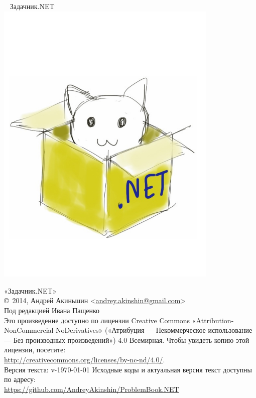 \begin{center}
~\vspace{4cm}\newline
{\Huge{Задачник.NET}}
\includegraphics[width=0.8\textwidth]{cover}
\end{center}
\newpage

\hbox{}
\vfill
{
\noindent
«Задачник.NET»\\
\copyright\ 2014, Андрей Акиньшин <\href{mailto:andrey.akinshin@gmail.com}{andrey.akinshin@gmail.com}>\\
Под редакцией Ивана Пащенко\\

\medskip
\noindent
Это произведение доступно по лицензии Creative Commons «Attribution-NonCommercial-NoDerivatives» («Атрибуция — Некоммерческое использование — Без производных произведений») 4.0 Всемирная. Чтобы увидеть копию этой лицензии, посетите:\\ \url{http://creativecommons.org/licenses/by-nc-nd/4.0/}.\\
Версия текста: v-\versiondate\today \newline
Исходные коды и актуальная версия текст доступны по адресу:\\ \url{https://github.com/AndreyAkinshin/ProblemBook.NET}
}
\newpage